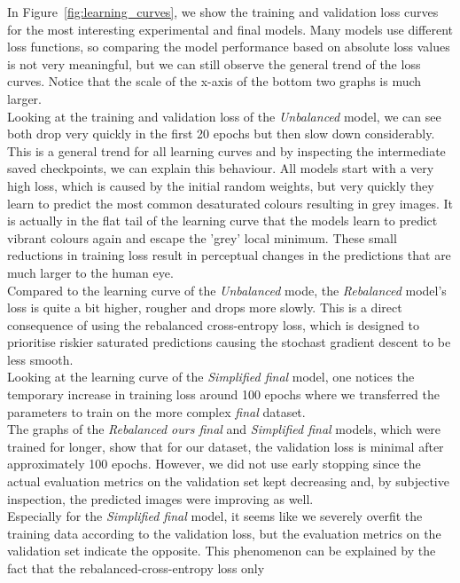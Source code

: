 \documentclass{article}
\begin{document}
In Figure~\ref{fig:learning_curves}, we show the training and validation loss curves for the most
interesting experimental and final models. Many models use different loss functions,
so comparing the model performance based on absolute loss values is not very meaningful, but we
can still observe the general trend of the loss curves.
Notice that the scale of the x-axis of the bottom two graphs is much larger.\\
Looking at the training and validation loss of the \textit{Unbalanced} model,
we can see both drop very quickly in the first 20 epochs but then slow down considerably.
This is a general trend for all learning curves and by inspecting the intermediate saved
checkpoints, we can explain this behaviour.
All models start with a very high loss, which is caused by the initial random weights, but
very quickly they learn to predict the most common desaturated colours resulting in grey images.
It is actually in the flat tail of the learning curve that the models learn to predict
vibrant colours again and escape the 'grey' local minimum. These small reductions
in training loss result in perceptual changes in the predictions that are much larger to the human eye.\\
Compared to the learning curve of the \textit{Unbalanced} mode, the \textit{Rebalanced} model's
loss is quite a bit higher, rougher and drops more slowly. This is a direct consequence of using
the rebalanced cross-entropy loss, which is designed to prioritise riskier saturated predictions
causing the stochast gradient descent to be less smooth.\\
Looking at the learning curve of the \textit{Simplified final} model, one notices
the temporary increase in training loss around 100 epochs where we transferred the parameters
to train on the more complex \textit{final} dataset.\\
The graphs of the \textit{Rebalanced ours final} and \textit{Simplified final} models, which
were trained for longer, show that for our dataset, the validation loss is minimal
after approximately 100 epochs.
However, we did not use early stopping since the actual evaluation metrics on the validation set
kept decreasing and, by subjective inspection, the predicted images were improving as well.\\
Especially for the \textit{Simplified final} model, it seems like we severely overfit the training data
according to the validation loss, but the evaluation metrics on the validation set indicate the opposite.
This phenomenon can be explained by the fact that the rebalanced-cross-entropy loss only
\end{document}
